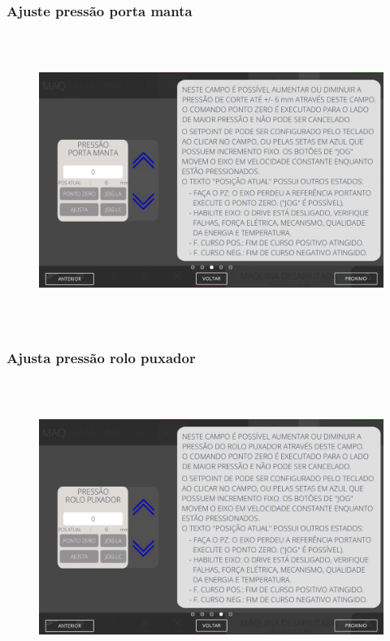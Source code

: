 \newpage
\thispagestyle{fancy}
\vspace*{40 pt}
\subsubsection{\small{Ajuste pressão porta manta}}\label{telaAjustesPerfuradoraAjustePressaoPortaManta}
\vspace*{\fill}
\begin{figure}[h]
  \centering
  \includegraphics[width=576px,height=360px]{src/imagesFlexo/06-drilling/settings/e-3.png}
\end{figure}
\vspace*{\fill}

\newpage
\thispagestyle{fancy}
\vspace*{40 pt}
\subsubsection{\small{Ajusta pressão rolo puxador}}\label{telaAjustesPerfuradoraAjustaPressaoRoloPuxador}
\vspace*{\fill}
\begin{figure}[h]
  \centering
  \includegraphics[width=576px,height=360px]{src/imagesFlexo/06-drilling/settings/e-4.png}
\end{figure}
\vspace*{\fill}

